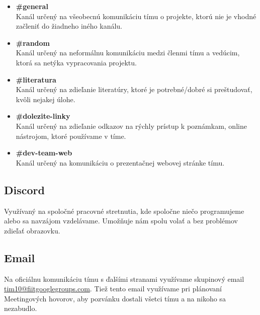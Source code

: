\documentclass{article}
\begin{document}
            \begin{itemize}
                \item \textbf{\#general} \\
                \textnormal{Kanál určený na všeobecnú komunikáciu tímu o projekte, ktorú nie je vhodné začleniť do žiadneho iného kanálu.}
                \item \textbf{\#random} \\
                \textnormal{Kanál určený na neformálnu komunikáciu medzi členmi tímu a vedúcim, ktorá sa netýka vypracovania projektu.}
                \item \textbf{\#literatura} \\
                \textnormal{Kanál určený na zdieľanie literatúry, ktoré je potrebné/dobré si preštudovať, kvôli nejakej úlohe.}
                \item \textbf{\#dolezite-linky} \\
                \textnormal{Kanál určený na zdieľanie odkazov na rýchly prístup k poznámkam, online nástrojom, ktoré používame v tíme.}
                \item \textbf{\#dev-team-web} \\
                \textnormal{Kanál určený na komunikáciu o prezentačnej webovej stránke tímu.}
            \end{itemize}

        \subsection*{Discord}

            \textnormal{Využívaný na spoločné pracovné stretnutia, kde spoločne niečo programujeme alebo sa navzájom vzdelávame. Umožňuje nám spolu volať a bez problémov zdieľať obrazovku.}

        \subsection*{Email}

            \textnormal{Na oficiálnu komunikáciu tímu s ďalšími stranami využívame skupinový email \href{mailto:tim10@fiitgooglegroups.com}{tim10@fiitgooglegroups.com}. Tiež tento email využívame pri plánovaní Meetingových hovorov, aby pozvánku dostali všetci tímu a na nikoho sa nezabudlo.}
\end{document}
